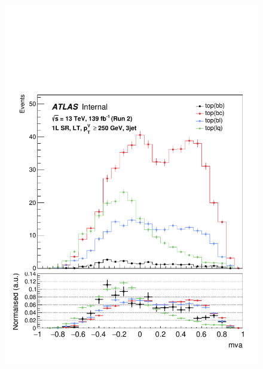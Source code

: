 \begin{figure}[h!]
\includegraphics[scale=0.253]{Images/VH/top/OneLepton_top_2lttag3jet_SR_250ptv_mva.pdf}

\end{figure}

